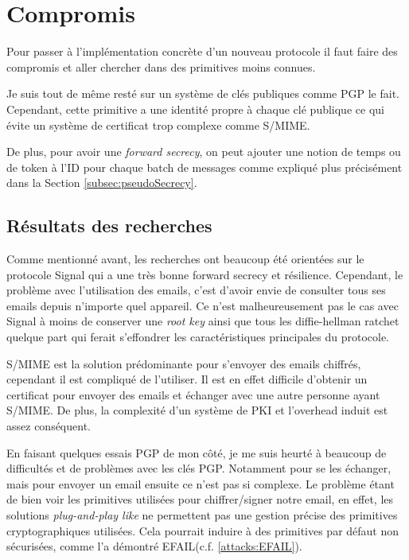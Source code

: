 \section{Compromis}
Pour passer à l'implémentation concrète d'un nouveau protocole il faut faire des compromis et aller chercher dans des primitives moins connues.

Je suis tout de même resté sur un système de clés publiques comme PGP le fait. Cependant, cette primitive a une identité propre à chaque clé publique ce qui évite un système de certificat trop complexe comme S/MIME.

De plus, pour avoir une \textit{forward secrecy}, on peut ajouter une notion de temps ou de token à l'ID pour chaque batch de messages comme expliqué plus précisément dans la Section \ref{subsec:pseudoSecrecy}.
\subsection{Résultats des recherches}
Comme mentionné avant, les recherches ont beaucoup été orientées sur le protocole Signal qui a une très bonne forward secrecy et résilience. Cependant, le problème avec l'utilisation des emails, c'est d'avoir envie de consulter tous ses emails depuis n'importe quel appareil. Ce n'est malheureusement pas le cas avec Signal à moins de conserver une \textit{root key} ainsi que tous les diffie-hellman ratchet quelque part qui ferait s'effondrer les caractéristiques principales du protocole.

S/MIME est la solution prédominante pour s'envoyer des emails chiffrés, cependant il est compliqué de l'utiliser. Il est en effet difficile d'obtenir un certificat pour envoyer des emails et échanger avec une autre personne ayant S/MIME. De plus, la complexité d'un système de PKI et l'overhead induit est assez conséquent.

En faisant quelques essais PGP de mon côté, je me suis heurté à beaucoup de difficultés et de problèmes avec les clés PGP. Notamment pour se les échanger, mais pour envoyer un email ensuite ce n'est pas si complexe. Le problème étant de bien voir les primitives utilisées pour chiffrer/signer notre email, en effet, les solutions \textit{plug-and-play like} ne permettent pas une gestion précise des primitives cryptographiques utilisées. Cela pourrait induire à des primitives par défaut non sécurisées, comme l'a démontré EFAIL(c.f. \ref{attacks:EFAIL}).

